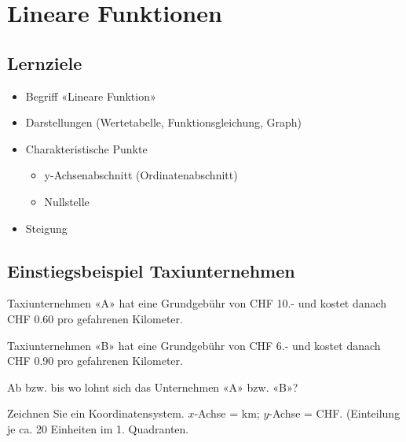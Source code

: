 
\section{Lineare Funktionen}
\label{lineare_funktionen}
\subsection*{Lernziele}

\begin{itemize}
\item Begriff «Lineare Funktion»
\item Darstellungen (Wertetabelle, Funktionsgleichung, Graph)
\item Charakteristische Punkte
  \begin{itemize}
  \item
    y-Achsenabschnitt (Ordinatenabschnitt)
  \item Nullstelle
  \end{itemize}
\item Steigung
\end{itemize}


\newpage

\subsection{Einstiegsbeispiel Taxiunternehmen}
Taxiunternehmen «A» hat eine Grundgebühr von CHF 10.- und kostet
danach CHF 0.60 pro gefahrenen Kilometer.

Taxiunternehmen «B» hat eine Grundgebühr von CHF 6.- und kostet
danach CHF 0.90 pro gefahrenen Kilometer.

Ab bzw. bis wo lohnt sich das Unternehmen «A» bzw. «B»?

  Zeichnen Sie ein Koordinatensystem. $x$-Achse = km; $y$-Achse = CHF.
  (Einteilung je ca. 20 Einheiten im 1. Quadranten.


